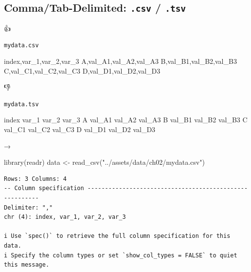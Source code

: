 \documentclass[
  letterpaper,
  DIV=11,
  numbers=noendperiod,
  oneside]{scrreprt}
\newenvironment{Shaded}{\begin{snugshade}}{\end{snugshade}}
\newcommand{\FunctionTok}[1]{\textcolor[rgb]{0.28,0.35,0.67}{#1}}
\newcommand{\NormalTok}[1]{\textcolor[rgb]{0.00,0.23,0.31}{#1}}
\newcommand{\OtherTok}[1]{\textcolor[rgb]{0.00,0.23,0.31}{#1}}
\newcommand{\StringTok}[1]{\textcolor[rgb]{0.13,0.47,0.30}{#1}}
\begin{document}
\hypertarget{commatab-delimited-.csv-.tsv}{%
\subsection{\texorpdfstring{Comma/Tab-Delimited: \texttt{.csv} /
\texttt{.tsv}}{Comma/Tab-Delimited: .csv / .tsv}}\label{commatab-delimited-.csv-.tsv}}

👍

\begin{codelisting}

\caption{\texttt{mydata.csv}}

\begin{Shaded}
\begin{Highlighting}[]
\NormalTok{index,var\_1,var\_2,var\_3}
\NormalTok{A,val\_A1,val\_A2,val\_A3}
\NormalTok{B,val\_B1,val\_B2,val\_B3}
\NormalTok{C,val\_C1,val\_C2,val\_C3}
\NormalTok{D,val\_D1,val\_D2,val\_D3}
\end{Highlighting}
\end{Shaded}

\end{codelisting}

👎

\begin{codelisting}

\caption{\texttt{mydata.tsv}}

\begin{Shaded}
\begin{Highlighting}[]
\NormalTok{index var\_1 var\_2 var\_3}
\NormalTok{A val\_A1  val\_A2  val\_A3}
\NormalTok{B val\_B1  val\_B2  val\_B3}
\NormalTok{C val\_C1  val\_C2  val\_C3}
\NormalTok{D val\_D1  val\_D2  val\_D3}
\end{Highlighting}
\end{Shaded}

\end{codelisting}

→

\begin{Shaded}
\begin{Highlighting}[]
\FunctionTok{library}\NormalTok{(readr)}
\NormalTok{data }\OtherTok{\textless{}{-}} \FunctionTok{read\_csv}\NormalTok{(}\StringTok{"../assets/data/ch02/mydata.csv"}\NormalTok{)}
\end{Highlighting}
\end{Shaded}

\begin{verbatim}
Rows: 3 Columns: 4
-- Column specification --------------------------------------------------------
Delimiter: ","
chr (4): index, var_1, var_2, var_3

i Use `spec()` to retrieve the full column specification for this data.
i Specify the column types or set `show_col_types = FALSE` to quiet this message.
\end{verbatim}
\end{document}
